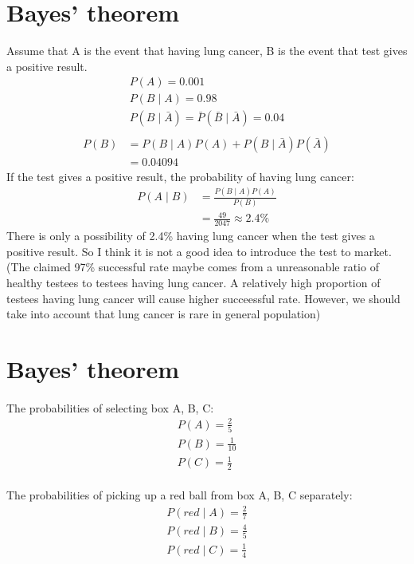 \documentclass{article}
\begin{document}
  \section{Bayes' theorem}
	Assume that A is the event that having lung cancer, B is the event that test gives a positive result.
	\begin{gather*}
		P(A)= 0.001\\
		P(B \mid A)= 0.98 \\
		P(B \mid \bar{A})= \bar{P}(\bar{B} \mid \bar{A})=0.04 \\
	\end{gather*}
	\begin{equation*}
	 \begin{aligned}
	 P(B)&=P(B \mid A)P(A)+P(B \mid \bar{A})P(\bar{A})\\
	 	 &=0.04094
	 \end{aligned}
	\end{equation*}
	If the test gives a positive result, the probability of having lung cancer:
	\begin{equation*}
	 \begin{aligned}
		P(A \mid B)&= \frac{P(B \mid A)P(A)}{P(B)} \\
				   &= \frac{49}{2047} \approx 2.4\%
	 \end{aligned}
	\end{equation*}	
	There is only a possibility of 2.4\% having lung cancer when the test gives a positive result. So I think it is not a good idea to introduce the test to market.
	(The claimed 97\% successful rate maybe comes from a unreasonable ratio of healthy testees to testees having lung cancer. A relatively high proportion of testees having lung cancer will cause higher succeessful rate. However, we should take into account that lung cancer is rare in general population)
  \section{Bayes' theorem}
   \paragraph{}The probabilities of selecting box A, B, C:
    \begin{gather*}
      P(A)=\frac{2}{5} \\
      P(B)=\frac{1}{10} \\
      P(C)=\frac{1}{2}
    \end{gather*}
   \paragraph{}The probabilities of picking up a red ball from box A, B, C separately:
   \begin{gather*}
  		P(red \mid A)=\frac{2}{7} \\
  		P(red \mid B)=\frac{4}{5} \\
  		P(red \mid C)=\frac{1}{4} 
  	\end{gather*}
\end{document}
